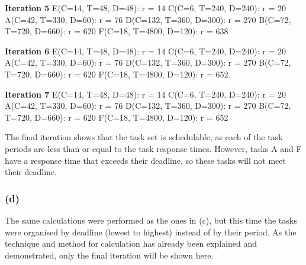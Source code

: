 \documentclass[]{report}
\begin{document}
			\textbf{Iteration 5} \newline
			E(C=14, T=48, D=48): r = 14 \newline
			C(C=6, T=240, D=240): r = 20 \newline
			A(C=42, T=330, D=60): r = 76 \newline
			D(C=132, T=360, D=300): r = 270 \newline
			B(C=72, T=720, D=660): r = 620 \newline
			F(C=18, T=4800, D=120): r = 638 \newline
	
			\textbf{Iteration 6} \newline
			E(C=14, T=48, D=48): r = 14 \newline
			C(C=6, T=240, D=240): r = 20 \newline
			A(C=42, T=330, D=60): r = 76 \newline
			D(C=132, T=360, D=300): r = 270 \newline
			B(C=72, T=720, D=660): r = 620 \newline
			F(C=18, T=4800, D=120): r = 652 \newline
	
			\textbf{Iteration 7} \newline
			E(C=14, T=48, D=48): r = 14 \newline
			C(C=6, T=240, D=240): r = 20 \newline
			A(C=42, T=330, D=60): r = 76 \newline
			D(C=132, T=360, D=300): r = 270 \newline
			B(C=72, T=720, D=660): r = 620 \newline
			F(C=18, T=4800, D=120): r = 652 \newline
			
			The final iteration shows that the task set is schedulable, as each of the task periods are less than or equal to the task response times. However, tasks A and F have a response time that exceeds their deadline, so these tasks will not meet their deadline.
			
			\subsubsection{(d)}
			The same calculations were performed as the ones in (c), but this time the tasks were organised by deadline (lowest to highest) instead of by their period. As the technique and method for calculation has already been explained and demonstrated, only the final iteration will be shown here.
			\medskip
\end{document}
